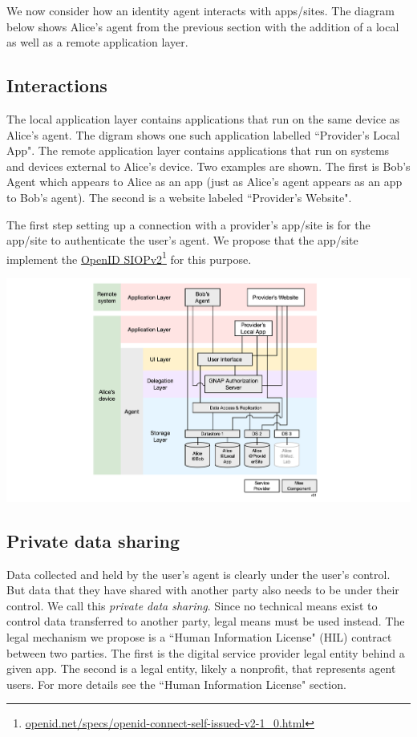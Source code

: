 \documentclass[11pt, oneside]{article}   	%
\newcommand{\hyperfootnote}[1][]{\def\ArgI{{#1}}\hyperfootnoteRelay}
\newcommand\hyperfootnoteRelay[2][]{\href{#1#2}{\ArgI}\footnote{\href{#1#2}{#2}}}
\begin{document}
We now consider how an identity agent interacts with apps/sites. The diagram below shows Alice's agent from the previous section with the addition of a local as well as a remote application layer. 

\subsection{Interactions}

The local application layer contains applications that run on the same device as Alice's agent. The digram shows one such application labelled ``Provider's Local App". The remote application layer contains applications that run on systems and devices external to Alice's device. Two examples are shown. The first is Bob's Agent which appears to Alice as an app (just as Alice's agent appears as an app to Bob's agent). The second is a website labeled ``Provider's Website". 

The first step setting up a connection with a provider's app/site is for the app/site to authenticate the user's agent. We propose that the app/site implement the \hyperfootnote[OpenID SIOPv2][https://]{openid.net/specs/openid-connect-self-issued-v2-1\_0.html} for this purpose.

\includegraphics[width=\textwidth]{./images/applications.png}

\subsection{Private data sharing}
Data collected and held by the user's agent is clearly under the user's control. But data that they have shared with another party also needs to be under their control. We call this \emph{private data sharing}. Since no technical means exist to control data transferred to another party, legal means must be used instead. The legal mechanism we propose is a ``Human Information License" (HIL) contract between two parties. The first is the digital service provider legal entity behind a given app. The second is a legal entity, likely a nonprofit, that represents agent users. For more details see the ``Human Information License" section.
\end{document}
